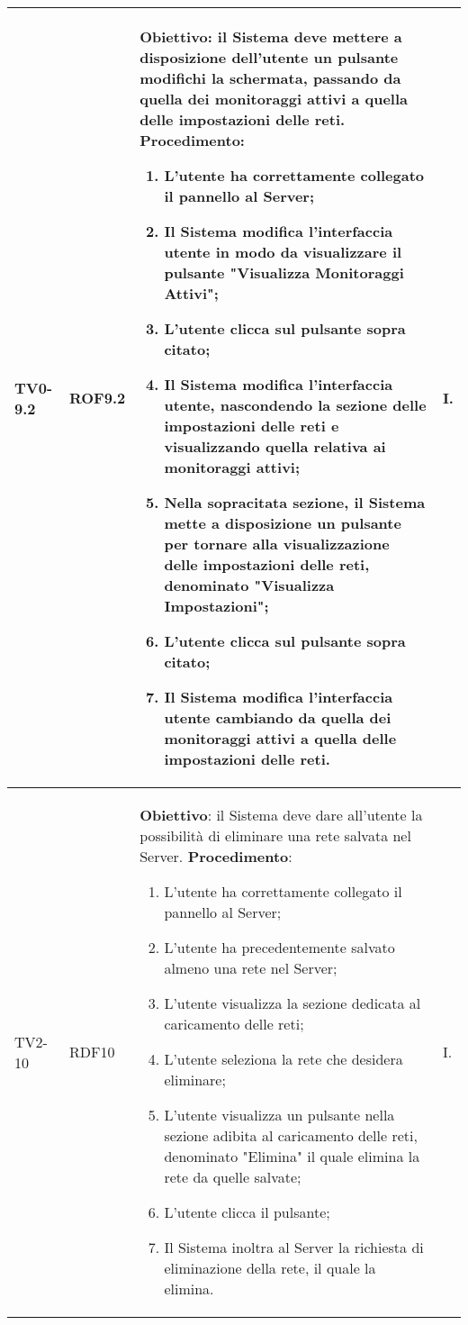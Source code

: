 \begin{longtable}{|C{.15\textwidth}|C{.13\textwidth}|m{.52\textwidth}|C{.08\textwidth}|}
TV0-9.2 & ROF9.2 &
	\textbf{Obiettivo}: il Sistema deve mettere a disposizione dell'utente un pulsante modifichi la schermata, passando da quella dei monitoraggi attivi a quella delle impostazioni delle reti. \newline
	\textbf{Procedimento}:
	\begin{enumerate}
		\item L'utente ha correttamente collegato il pannello al Server;
		\item Il Sistema modifica l'interfaccia utente in modo da visualizzare il pulsante "Visualizza Monitoraggi Attivi";
		\item L'utente clicca sul pulsante sopra citato;
		\item Il Sistema modifica l'interfaccia utente, nascondendo la sezione delle impostazioni delle reti e visualizzando quella relativa ai monitoraggi attivi;
		\item Nella sopracitata sezione, il Sistema mette a disposizione un pulsante per tornare alla visualizzazione delle impostazioni delle reti, denominato "Visualizza Impostazioni";
		\item L'utente clicca sul pulsante sopra citato;
		\item Il Sistema modifica l'interfaccia utente cambiando da quella dei monitoraggi attivi a quella delle impostazioni delle reti.
	\end{enumerate}
	& I. \\
\hline

TV2-10 & RDF10 &
	\textbf{Obiettivo}: il Sistema deve dare all'utente la possibilità di eliminare una rete salvata nel Server. \newline
	\textbf{Procedimento}:
	\begin{enumerate}
		\item L'utente ha correttamente collegato il pannello al Server;
		\item L'utente ha precedentemente salvato almeno una rete nel Server;
		\item L'utente visualizza la sezione dedicata al caricamento delle reti;
		\item L'utente seleziona la rete che desidera eliminare;
		\item L'utente visualizza un pulsante nella sezione adibita al caricamento delle reti, denominato "Elimina" il quale elimina la rete da quelle salvate;
		\item L'utente clicca il pulsante;
		\item Il Sistema inoltra al Server la richiesta di eliminazione della rete, il quale la elimina.
	\end{enumerate}
	& I. \\
\hline



\end{longtable}
